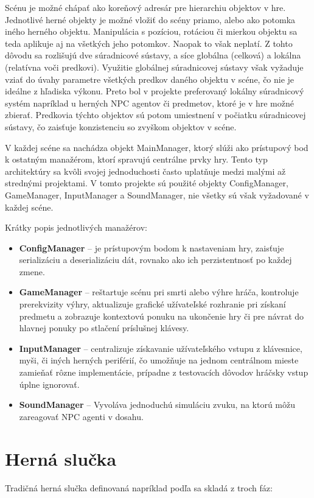 \documentclass[slovak, master]{diploma}
\begin{document}
Scénu je možné chápať ako koreňový adresár pre hierarchiu objektov v hre. Jednotlivé herné objekty je možné vložiť do scény priamo, alebo ako potomka iného herného objektu. Manipulácia s pozíciou, rotáciou či mierkou objektu sa teda aplikuje aj na všetkých jeho potomkov. Naopak to však neplatí. Z tohto dôvodu sa rozlišujú dve súradnicové sústavy, a síce globálna (celková) a lokálna (relatívna voči predkovi). Využitie globálnej súradnicovej sústavy však vyžaduje vziať do úvahy parametre všetkých predkov daného objektu v scéne, čo nie je ideálne z hľadiska výkonu. Preto bol v projekte preferovaný lokálny súradnicový systém napríklad u herných NPC agentov či predmetov, ktoré je v hre možné zbierať. Predkovia týchto objektov sú potom umiestnení v počiatku súradnicovej sústavy, čo zaisťuje konzistenciu so zvyškom objektov v scéne.

V každej scéne sa nachádza objekt MainManager, ktorý slúži ako prístupový bod k ostatným manažérom, ktorí spravujú centrálne prvky hry. Tento typ architektúry sa kvôli svojej jednoduchosti často uplatňuje medzi malými až strednými projektami. V tomto projekte sú použité objekty ConfigManager, GameManager, InputManager a SoundManager, nie všetky sú však vyžadované v každej scéne. 

Krátky popis jednotlivých manažérov:
\begin{itemize}
  \item \textbf{ConfigManager} -- je prístupovým bodom k nastaveniam hry, zaisťuje serializáciu a deserializáciu dát, rovnako ako ich perzistentnosť po každej zmene.
  \item \textbf{GameManager} -- reštartuje scénu pri smrti alebo výhre hráča, kontroluje prerekvizity výhry, aktualizuje grafické užívateľské rozhranie pri získaní predmetu a zobrazuje kontextovú ponuku na ukončenie hry či pre návrat do hlavnej ponuky po stlačení príslušnej klávesy.
  \item \textbf{InputManager} -- centralizuje získavanie užívateľského vstupu z klávesnice, myši, či iných herných periférií, čo umožňuje na jednom centrálnom mieste zamieňať rôzne implementácie, prípadne z testovacích dôvodov hráčsky vstup úplne ignorovať. 
  \item \textbf{SoundManager} -- Vyvoláva jednoduchú simuláciu zvuku, na ktorú môžu zareagovať NPC agenti v dosahu.
\end{itemize}

\section{Herná slučka}
\label{sec:GameLoop}
Tradičná herná slučka definovaná napríklad podľa \cite{GameAlgorithms} sa skladá z troch fáz:
\end{document}

